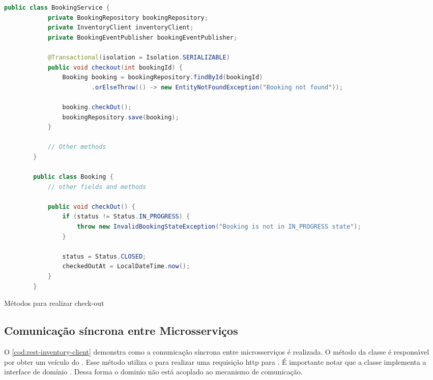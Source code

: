 \begin{codigo}[H]
    \begin{lstlisting}[language=Java]
        public class BookingService {
            private BookingRepository bookingRepository;
            private InventoryClient inventoryClient;
            private BookingEventPublisher bookingEventPublisher;

            @Transactional(isolation = Isolation.SERIALIZABLE)
            public void checkout(int bookingId) {
                Booking booking = bookingRepository.findById(bookingId)
                        .orElseThrow(() -> new EntityNotFoundException("Booking not found"));

                booking.checkOut();
                bookingRepository.save(booking);
            }

            // Other methods
        }

        public class Booking {
            // other fields and methods

            public void checkOut() {
                if (status != Status.IN_PROGRESS) {
                    throw new InvalidBookingStateException("Booking is not in IN_PROGRESS state");
                }

                status = Status.CLOSED;
                checkedOutAt = LocalDateTime.now();
            }
        }
    \end{lstlisting}
    \caption{Métodos para realizar check-out}
    \label{cod:realizar-check-out}
\end{codigo}

\subsection{Comunicação síncrona entre Microsserviços}
O \autoref{cod:rest-inventory-client} demonstra como a comunicação síncrona entre microsserviços é realizada. O método  da classe  é responsável por obter um veículo do . Esse método utiliza o  para realizar uma requisição \acrshort{http} para . É importante notar que a classe  implementa a interface de domínio . Dessa forma o dominio não está acoplado ao mecanismo de comunicação.

